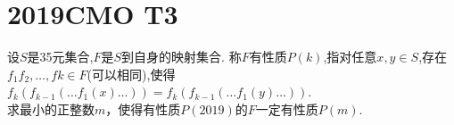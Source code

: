 \documentclass[]{article}
\title{}
\author{}
\date{}
\begin{document}
\maketitle
\section{2019CMO T3}{
设$S$是35元集合,$F$是$S$到自身的映射集合. 称$F$有性质$P(k)$,指对任意$x,y \in S$,存在$f_1f_2,…,fk \in F$(可以相同),使得$f_k(f_{k-1}(…f_1(x)…))=f_k(f_{k-1}(…f_1(y)…))$.\\ 求最小的正整数$m$，使得有性质$P(2019)$的$F$一定有性质$P(m)$.
}
\end{document}

